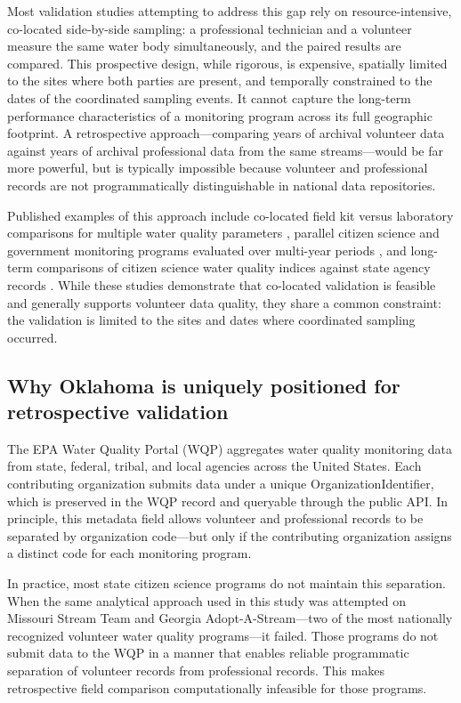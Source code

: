 \documentclass[lineno]{wlpeerj}
\begin{document}
Most validation studies attempting to address this gap rely on resource-intensive, co-located side-by-side sampling: a professional technician and a volunteer measure the same water body simultaneously, and the paired results are compared. This prospective design, while rigorous, is expensive, spatially limited to the sites where both parties are present, and temporally constrained to the dates of the coordinated sampling events. It cannot capture the long-term performance characteristics of a monitoring program across its full geographic footprint. A retrospective approach---comparing years of archival volunteer data against years of archival professional data from the same streams---would be far more powerful, but is typically impossible because volunteer and professional records are not programmatically distinguishable in national data repositories.

Published examples of this approach include co-located field kit versus laboratory comparisons for multiple water quality parameters \citep{Quinlivan2020}, parallel citizen science and government monitoring programs evaluated over multi-year periods \citep{Dickson2024}, and long-term comparisons of citizen science water quality indices against state agency records \citep{deCamargoReis2026}. While these studies demonstrate that co-located validation is feasible and generally supports volunteer data quality, they share a common constraint: the validation is limited to the sites and dates where coordinated sampling occurred.

\subsection{Why Oklahoma is uniquely positioned for retrospective validation}

The EPA Water Quality Portal (WQP) aggregates water quality monitoring data from state, federal, tribal, and local agencies across the United States. Each contributing organization submits data under a unique OrganizationIdentifier, which is preserved in the WQP record and queryable through the public API. In principle, this metadata field allows volunteer and professional records to be separated by organization code---but only if the contributing organization assigns a distinct code for each monitoring program.

In practice, most state citizen science programs do not maintain this separation. When the same analytical approach used in this study was attempted on Missouri Stream Team and Georgia Adopt-A-Stream---two of the most nationally recognized volunteer water quality programs---it failed. Those programs do not submit data to the WQP in a manner that enables reliable programmatic separation of volunteer records from professional records. This makes retrospective field comparison computationally infeasible for those programs.
\end{document}
